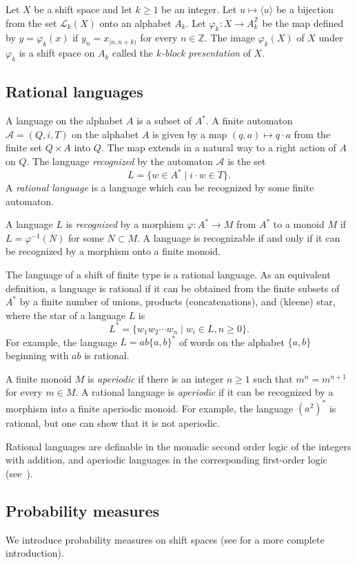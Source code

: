 \documentclass{article}[11pt]
\newcommand\A{\mathcal{A}}
\newcommand\cL{\mathcal{L}}
\newcommand{\Z}{\mathbb{Z}}
\numberwithin{theorem}{section}
\numberwithin{equation}{section}
\numberwithin{figure}{section}
\numberwithin{table}{section}
\begin{document}
Let $X$ be a shift space and let $k\ge 1$ be an integer. Let $u\mapsto \langle u\rangle$
be a bijection from the set $\cL_k(X)$ onto an alphabet $A_k$. Let $\varphi_k\colon X\to A_k^\Z$ be
the map defined by $y=\varphi_k(x)$ if $y_n=x_{[n,n+k)}$ for every $n\in\Z$.
The image $\varphi_k(X)$ of $X$ under $\varphi_k$ is a shift space on $A_k$ called
the \emph{$k$-block presentation} of $X$.

\subsection{Rational languages}

A language on the alphabet $A$ is a subset of $A^*$.
A finite automaton $\A=(Q,i,T)$ on the alphabet $A$ is given by a map $(q,a)\mapsto q\cdot a$
from the finite set $Q\times A$ into $Q$. The map extends in a natural way to a right action of $A$
on $Q$. The language \emph{recognized} by the automaton $\A$ is the set 
\[L=\{w\in A^*\mid i\cdot w\in T\}.\]
A \emph{rational language} is a language which can be recognized by some finite automaton. 

A language $L$ is \emph{recognized} by a morphism $\varphi\colon A^*\to M$
from $A^*$ to a monoid $M$ if $L=\varphi^{-1}(N)$ for some $N\subset M$.
A language is recognizable if and only if it can be recognized by a morphism 
onto a finite monoid.

The language of a shift of finite type is a rational language.
As an equivalent definition, a language is rational if it can be obtained from
the finite subsets of $A^*$ by a finite number of unions, products (concatenations), and (kleene) star, where
the star of a language $L$ is \[L^*=\{w_1w_2\cdots w_n\mid w_i\in L, n\ge 0\}.\]
For example, the language $L=ab\{a,b\}^*$ of words on the alphabet $\{a,b\}$
beginning with $ab$ is rational.

A finite monoid $M$ is \emph{aperiodic} if there is an integer $n\ge 1$ such that
$m^{n}=m^{n+1}$ for every $m\in M$.
A rational language is \emph{aperiodic} if it can be recognized by a morphism into a finite aperiodic monoid.
For example, the language $(a^2)^*$ is rational, but one can show that it is not aperiodic.

Rational languages are definable in the monadic second order logic of the integers with addition,
and aperiodic languages in the corresponding first-order logic (see~\cite{book/Perrin2004}).

\subsection{Probability measures}
We introduce probability measures on shift spaces
(see \cite{BoylePetersen2011} for a more complete introduction).
\end{document}
